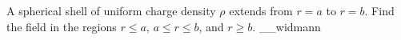 A spherical shell of uniform charge density $\rho$ extends from $r=a$ to
$r=b$. Find the field in the regions $r\le a$, $a\le r\le b$, and $r\ge b$.
__widmann
\answercheck

